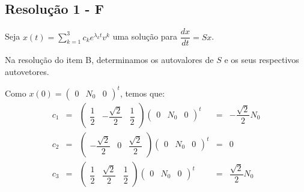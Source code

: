 \subsection*{\blue Resolução 1 - \textbf{F}}

Seja $x(t) = \displaystyle\sum_{k=1}^{3} c_{k}e^{\lambda_{k}t}v^{k}$ uma solução para $\dfrac{dx}{dt} = Sx$.

Na resolução do item B, determinamos os autovalores de $S$ e os seus respectivos autovetores.

Como \(x(0) = \left(\begin{array}{ccc} 0 & N_{0} & 0 \end{array}\right)^t\), temos que:
\[\begin{array}{rclcl}
c_{1} &=& \left(\begin{array}{ccc} \dfrac{1}{2} & - \dfrac{\sqrt{2}}{2} & \dfrac{1}{2} \end{array}\right) \left(\begin{array}{ccc} 0 & N_{0} & 0 \end{array}\right)^{t} &=& - \dfrac{\sqrt{2}}{2}N_{0} \\
c_{2} &=& \left(\begin{array}{ccc} - \dfrac{\sqrt{2}}{2} & 0 & \dfrac{\sqrt{2}}{2} \end{array}\right) \left(\begin{array}{ccc} 0 & N_{0} & 0 \end{array}\right)^{t} &=& 0 \\
c_{3} &=& \left(\begin{array}{ccc} \dfrac{1}{2} & \dfrac{\sqrt{2}}{2} & \dfrac{1}{2} \end{array}\right) \left(\begin{array}{ccc} 0 & N_{0} & 0 \end{array}\right)^{t} &=& \dfrac{\sqrt{2}}{2}N_{0}
\end{array}\]

